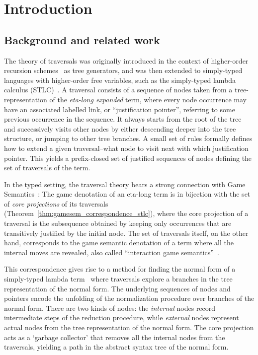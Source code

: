 \documentclass{elsarticle}
\theoremstyle{plain}
\theoremstyle{definition}
\begin{document}
\maketitle


\section{Introduction}

\subsection{Background and related work}
The theory of traversals was originally introduced in the context of higher-order recursion schemes~\cite{OngLics2006} as tree generators, and was
then extended to simply-typed languages with higher-order free variables, such as the simply-typed lambda calculus (STLC)~\cite{BlumPhd}. A traversal consists of a sequence of nodes taken from a tree-representation of the \emph{eta-long expanded} term, where every node occurrence may have an associated labelled link, or ``justification pointer'', referring to some previous occurrence in the sequence. It always starts from the root of the tree and successively visits other nodes by either descending deeper into the tree structure, or jumping to other tree branches. A small set of rules formally defines how to extend a given traversal--what node to visit next with which justification pointer. This yields a prefix-closed set of justified sequences of nodes defining the set of traversals of the term.

In the typed setting, the traversal theory bears a strong connection with Game Semantics~\cite{BlumPhd}: The game denotation of an eta-long term is in bijection with the set of \emph{core projections} of its traversals (Theorem~\ref{thm:gamesem_correspondence_stlc}), where the core projection of a traversal is the subsequence obtained by keeping only occurrences that are
transitively justified by the initial node.
The set of traversals itself, on the other hand, corresponds to the game semantic denotation of a term where all the internal moves are revealed, also called ``interaction game semantics''~\cite{BlumPhd}.

This correspondence gives rise to a method for finding the normal form of a simply-typed lambda term~\cite{BlumPhd,BlumGalop2008,Blum-LocalBeta2008}
where traversals explore a branches in the tree representation of the normal form. The underlying sequences of nodes and pointers encode the unfolding of the normalization procedure over branches of the normal form. There are two kinds of nodes: the \emph{internal} nodes record intermediate steps of the reduction procedure, while \emph{external} nodes represent actual nodes from the tree representation of the normal form. The core projection acts as a `garbage collector' that removes all the internal nodes from the traversals,  yielding a path in the abstract syntax tree of the normal form.
\end{document}
